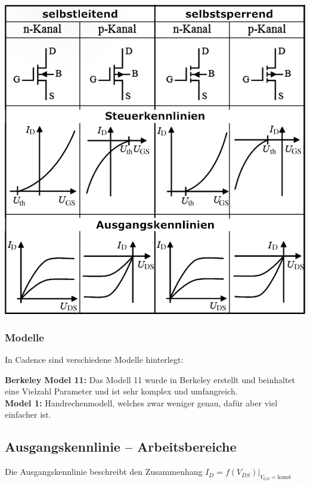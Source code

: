 \begin{minipage}[t]{0.5\columnwidth}
    \includegraphics[width=\columnwidth, align=t]{images/MOSFET_uebersicht.pdf}
\end{minipage}



\subsubsection{Modelle}
In Cadence sind verschiedene Modelle hinterlegt:

\textbf{Berkeley Model 11:} Das Modell 11 wurde in Berkeley erstellt und beinhaltet eine Vielzahl Parameter und ist sehr komplex und umfangreich. \\
\textbf{Model 1:} Handrechenmodell, welches zwar weniger genau, dafür aber viel einfacher ist.


\subsection{Ausgangskennlinie -- Arbeitsbereiche}
 
Die Ausgangskennlinie beschreibt den Zusammenhang $I_D = f(V_{DS}) \big|_{V_{GS} = \text{konst}}$

